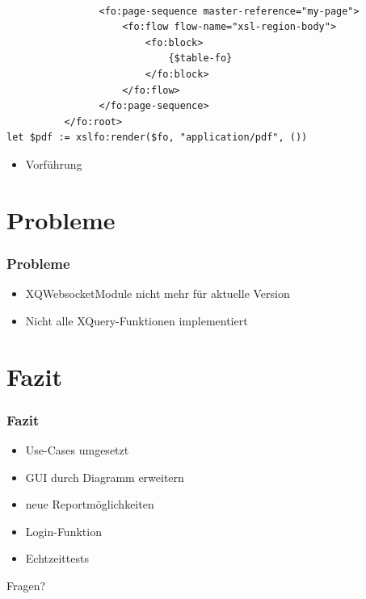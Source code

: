 \documentclass{beamer}
\begin{document}
\begin{frame}[fragile]
\begin{lstlisting}                
                
                <fo:page-sequence master-reference="my-page">
                    <fo:flow flow-name="xsl-region-body">
                        <fo:block>
                            {$table-fo}
                        </fo:block>
                    </fo:flow>
                </fo:page-sequence>
          </fo:root>
let $pdf := xslfo:render($fo, "application/pdf", ())
\end{lstlisting}
\end{frame}

\begin{frame}
\begin{itemize}
\item Vorführung
\end{itemize}
\end{frame}

\section{Probleme}
\begin{frame}
\frametitle{Probleme}
\begin{itemize}
	\item XQWebsocketModule nicht mehr für aktuelle Version
	\item Nicht alle XQuery-Funktionen implementiert
\end{itemize}
\end{frame}

\section{Fazit}
\begin{frame}
\frametitle{Fazit}
\begin{itemize}
	\item Use-Cases umgesetzt
	\item GUI durch Diagramm erweitern
	\item neue Reportmöglichkeiten
	\item Login-Funktion
	\item Echtzeittests
\end{itemize}
\end{frame}

\begin{frame}
\begin{center}
\Huge Fragen?
\end{center}

\end{frame}
\end{document}
